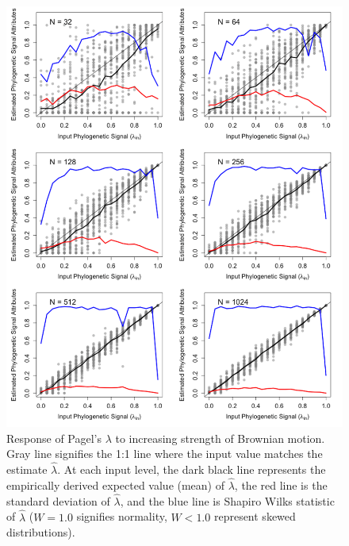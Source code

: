 \documentclass[
]{article}
\begin{document}
\begin{figure}
\includegraphics[width=1\linewidth]{Figs/fig.1} \caption{Response of Pagel's $\lambda$ to increasing strength of Brownian motion. Gray line signifies the 1:1 line where the input value matches the estimate $\hat\lambda$. At each input level, the dark black line represents the empirically derived expected value (mean) of $\hat\lambda$, the red line is the standard deviation of $\hat\lambda$, and the blue line is Shapiro Wilks statistic of $\hat\lambda$ ($W=1.0$ signifies normality, $W< 1.0$ represent skewed distributions). }\label{fig:unnamed-chunk-3}
\end{figure}
\end{document}
